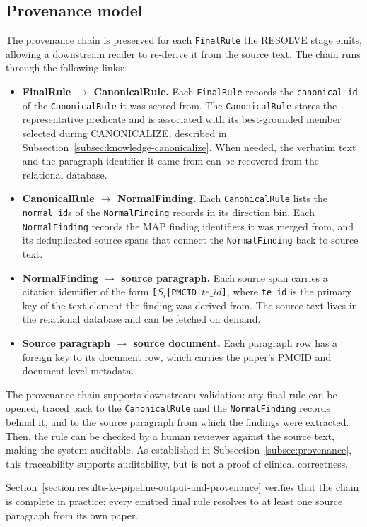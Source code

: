 \subsection{Provenance model}\label{subsec:knowledge-provenance-model}

The provenance chain is preserved for each \texttt{FinalRule} the RESOLVE stage emits, allowing a downstream reader to re-derive it from the source text. The chain runs through the following links: 

\begin{itemize}[label={},leftmargin=1.5em]
    \item \textbf{FinalRule $\to$ CanonicalRule.} Each \texttt{FinalRule} records the \texttt{canonical\_id} of the \texttt{CanonicalRule} it was scored from. The \texttt{CanonicalRule} stores the representative predicate and is associated with its best-grounded member selected during CANONICALIZE, described in Subsection~\ref{subsec:knowledge-canonicalize}. When needed, the verbatim text and the paragraph identifier it came from can be recovered from the relational database.
    
    \item \textbf{CanonicalRule $\to$ NormalFinding.} Each \texttt{CanonicalRule} lists the \texttt{normal\_id}s of the \texttt{NormalFinding} records in its direction bin. Each \texttt{NormalFinding} records the MAP finding identifiers it was merged from, and its deduplicated source spans that connect the \texttt{NormalFinding} back to source text.
    
    \item \textbf{NormalFinding $\to$ source paragraph.} Each source span carries a citation identifier of the form \texttt{[$S_{i}$|PMCID|$te\_id$]}, where \texttt{te\_id} is the primary key of the text element the finding was derived from. The source text lives in the relational database and can be fetched on demand.
    
    \item \textbf{Source paragraph $\to$ source document.} Each paragraph row has a foreign key to its document row, which carries the paper's PMCID and document-level metadata.
\end{itemize}

The provenance chain supports downstream validation: any final rule can be opened, traced back to the \texttt{CanonicalRule} and the \texttt{NormalFinding} records behind it, and to the source paragraph from which the findings were extracted. Then, the rule can be checked by a human reviewer against the source text, making the system auditable. As established in Subsection~\ref{subsec:provenance}, this traceability supports auditability, but is not a proof of clinical correctness.

Section~\ref{section:results-ke-pipeline-output-and-provenance} verifies that the chain is complete in practice: every emitted final rule resolves to at least one source paragraph from its own paper. 